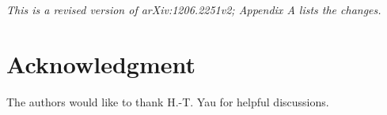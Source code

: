 \documentclass[reqno, 10pt]{amsart}
\theoremstyle{definition}
\theoremstyle{remark}
\numberwithin{equation}{section}
\numberwithin{thm}{section}
\begin{document}
 
\maketitle{} \thispagestyle{headings}

\noindent\emph{This is a revised version of arXiv:1206.2251v2; Appendix A lists the changes.}
\medskip







\appendix

\section*{Acknowledgment} 
The authors would like to thank H.-T. Yau for helpful discussions.
\end{document}
